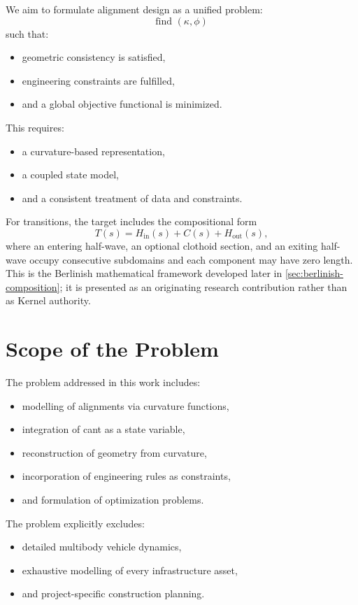 We aim to formulate alignment design as a unified problem:
\[
\text{find } (\kappa,\phi)
\]
such that:
\begin{itemize}
\item geometric consistency is satisfied,
\item engineering constraints are fulfilled,
\item and a global objective functional is minimized.
\end{itemize}

This requires:
\begin{itemize}
\item a curvature-based representation,
\item a coupled state model,
\item and a consistent treatment of data and constraints.
\end{itemize}

For transitions, the target includes the compositional form
\[
T(s)=H_{\mathrm{in}}(s)+C(s)+H_{\mathrm{out}}(s),
\]
where an entering half-wave, an optional clothoid section, and an exiting
half-wave occupy consecutive subdomains and each component may have zero
length. This is the Berlinish mathematical framework developed later in
\cref{sec:berlinish-composition}; it is presented as an originating research
contribution rather than as Kernel authority.

\section{Scope of the Problem}

The problem addressed in this work includes:
\begin{itemize}
\item modelling of alignments via curvature functions,
\item integration of cant as a state variable,
\item reconstruction of geometry from curvature,
\item incorporation of engineering rules as constraints,
\item and formulation of optimization problems.
\end{itemize}

The problem explicitly excludes:
\begin{itemize}
\item detailed multibody vehicle dynamics,
\item exhaustive modelling of every infrastructure asset,
\item and project-specific construction planning.
\end{itemize}

